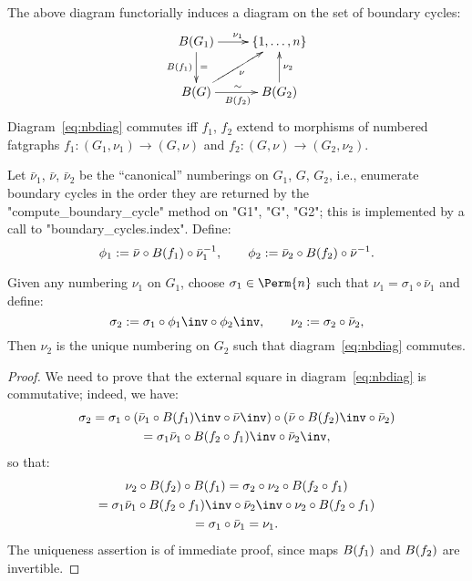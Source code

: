 The above diagram functorially induces a diagram on the set of
boundary cycles:
\begin{equation}
  \label{eq:nbdiag}
  \xymatrix{
    \Holes{G_1} & \{1, \ldots, n\}
    \\
    \Holes{G}   &  \Holes{G_2}
    \ar_{\Holes{f_1}}^{=} "1,1";"2,1"
    \ar_{\Holes{f_2}}^{\sim} "2,1";"2,2"
    \ar^{\nu_1} "1,1";"1,2"
    \ar_{\nu} "2,1";"1,2"
    \ar_{\nu_2} "2,2";"1,2"
  }
\end{equation}
Diagram~\eqref{eq:nbdiag} commutes iff $f_1$, $f_2$ extend to
morphisms of numbered fatgraphs $f_1: (G_1, \nu_1) \to (G, \nu)$ and
$f_2 : (G, \nu) \to (G_2, \nu_2)$.

Let $\bar\nu_1$, $\bar\nu$, $\bar\nu_2$ be the ``canonical''
numberings on $G_1$, $G$, $G_2$, i.e., enumerate
boundary cycles in the order they are returned by the
"compute_boundary_cycle" method on "G1", "G", "G2"; this is
implemented by a call to "boundary_cycles.index".  Define:
\begin{equation}
  \label{eq:phi-maps}
  \phi_1 := \bar\nu \circ B(f_1) \circ \bar\nu_1^{-1},
  \qquad
  \phi_2 := \bar\nu_2 \circ B(f_2) \circ \bar\nu^{-1}.
\end{equation}

\begin{lemma}\label{lemma:unique-nu}
  Given any numbering $\nu_1$ on $G_1$, choose $\sigma_1 \in \Perm{n}$ such that
  $\nu_1 = \sigma_1 \circ \bar\nu_1$ and define:
  \begin{equation}\label{eq:nu2}
    \sigma_2 := \sigma_1 \circ \phi_1\inv \circ \phi_2\inv,
    \qquad
    \nu_2 := \sigma_2 \circ \bar\nu_2 ,
  \end{equation}
  Then $\nu_2$ is the unique numbering on $G_2$ such that
  diagram~\eqref{eq:nbdiag} commutes.
\end{lemma}
\begin{proof}
  We need to prove that the external square in diagram~\eqref{eq:nbdiag} is commutative;
  indeed, we have:
  \begin{multline*}
    \sigma_2 = \sigma_1 \circ (\bar\nu_1 \circ \Holes{f_1}\inv \circ
    \bar\nu\inv) \circ ( \bar\nu \circ \Holes{f_2}\inv \circ
    \bar\nu_2)
    \\
    = \sigma_1 \bar\nu_1 \circ \Holes{f_2 \circ f_1}\inv \circ
    \bar\nu_2\inv,
  \end{multline*}
  so that:
  \begin{multline*}
    \nu_2 \circ \Holes{f_2} \circ \Holes{f_1} = \sigma_2 \circ \nu_2
    \circ \Holes{f_2 \circ f_1}
    \\
    = \sigma_1 \bar\nu_1 \circ \Holes{f_2 \circ f_1}\inv \circ
    \bar\nu_2\inv \circ \nu_2 \circ \Holes{f_2 \circ f_1}
    \\
    = \sigma_1 \circ \bar\nu_1 = \nu_1.
  \end{multline*}
  The uniqueness assertion is of immediate proof, since maps
  $B(f_1)$ and $B(f_2)$ are invertible.
\end{proof}

